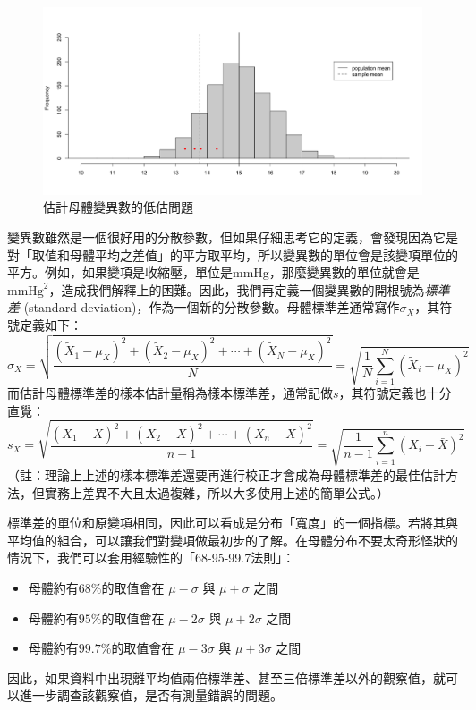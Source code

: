     \begin{figure}[htbp]
      \centering
      \includegraphics[width=\textwidth]{figures/02-Descriptive_statistics/degrees_of_freedom.png}
      \caption{估計母體變異數的低估問題}
      \label{fig:degrees_of_freedom}
    \end{figure}

    變異數雖然是一個很好用的分散參數，但如果仔細思考它的定義，會發現因為它是對「取值和母體平均之差值」的平方取平均，所以變異數的單位會是該變項單位的平方。例如，如果變項是收縮壓，單位是mmHg，那麼變異數的單位就會是$\text{mmHg}^2$，造成我們解釋上的困難。因此，我們再定義一個變異數的開根號為\textit{標準差} (standard deviation)，作為一個新的分散參數。母體標準差通常寫作$\sigma_X$，其符號定義如下：
    \[\sigma_X = \sqrt{\frac{(\tilde{X}_1-\mu_X)^2+(\tilde{X}_2-\mu_X)^2+\cdots+(\tilde{X}_N-\mu_X)^2}{N}} = \sqrt{\frac{1}{N} \sum_{i=1}^N (\tilde{X}_i-\mu_X)^2}\]
    而估計母體標準差的樣本估計量稱為樣本標準差，通常記做$s$，其符號定義也十分直覺：
    \[s_X = \sqrt{\frac{(X_1-\bar{X})^2+(X_2-\bar{X})^2+\cdots+(X_n-\bar{X})^2}{n-1}} = \sqrt{\frac{1}{n-1} \sum_{i=1}^n (X_i-\bar{X})^2}\]
    （註：理論上上述的樣本標準差還要再進行校正才會成為母體標準差的最佳估計方法，但實務上差異不大且太過複雜，所以大多使用上述的簡單公式。）

    標準差的單位和原變項相同，因此可以看成是分布「寬度」的一個指標。若將其與平均值的組合，可以讓我們對變項做最初步的了解。在母體分布不要太奇形怪狀的情況下，我們可以套用經驗性的「68-95-99.7法則」：
    \begin{itemize}
        \item 母體約有$68\%$的取值會在 $\mu-\sigma$ 與 $\mu+\sigma$ 之間
        \item 母體約有$95\%$的取值會在 $\mu-2\sigma$ 與 $\mu+2\sigma$ 之間
        \item 母體約有$99.7\%$的取值會在 $\mu-3\sigma$ 與 $\mu+3\sigma$ 之間
    \end{itemize}
    因此，如果資料中出現離平均值兩倍標準差、甚至三倍標準差以外的觀察值，就可以進一步調查該觀察值，是否有測量錯誤的問題。
    
